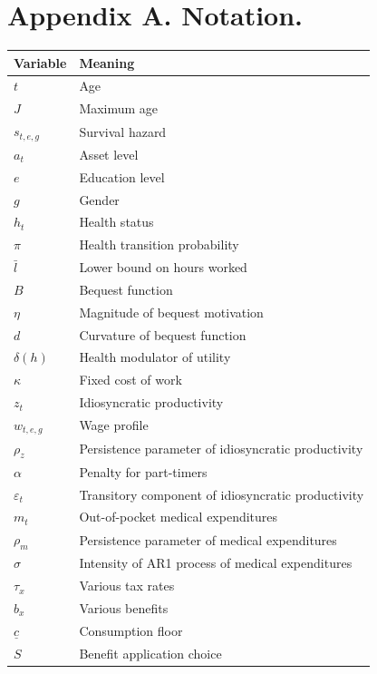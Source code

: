 \documentclass[
10pt, %
a4paper, %
oneside, %
headinclude,footinclude, %
BCOR5mm, %
]{scrartcl}
\begin{document}

\section{Appendix A. Notation.}

\begin{center}
	\begin{tabular}{| l | l |}
	\hline
	Variable & Meaning \\
	\hline
	$t$ & Age \\
	$J$ & Maximum age \\
	$s_{t,e,g}$ & Survival hazard \\
	$a_{t}$ & Asset level \\
	$e$ & Education level \\
	$g$ & Gender \\
	$h_{t}$ & Health status \\
	$\pi$ & Health transition probability \\
	$\bar{l}$ & Lower bound on hours worked \\
	$B$ & Bequest function \\
	$\eta$ & Magnitude of bequest motivation \\
	$d$ & Curvature of bequest function \\
	$\delta(h)$ & Health modulator of utility \\
	$\kappa$ &  Fixed cost of work \\
	$z_{t}$ & Idiosyncratic productivity \\
	$w_{t,e,g}$ & Wage profile \\
	$\rho_z$ & Persistence parameter of idiosyncratic productivity \\
	$\alpha$ & Penalty for part-timers \\
	$\varepsilon_t$ & Transitory component of idiosyncratic productivity \\
	$m_t$ & Out-of-pocket medical expenditures \\
	$\rho_m$ & Persistence parameter of medical expenditures \\
	$\sigma$ & Intensity of AR1 process of medical expenditures \\
	$\tau_x$ & Various tax rates \\
	$b_x$ & Various benefits \\
	$\underline{c}$ & Consumption floor \\
	$S$ &  Benefit application choice \\
	\hline
	\end{tabular}
\end{center}
\end{document}
